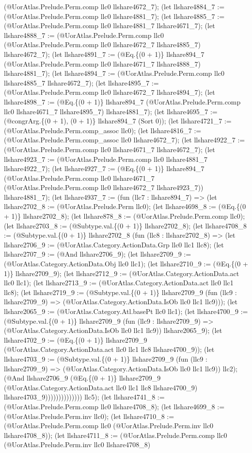 \documentclass[11pt]{article}
\begin{document}
(@UorAtlas.Prelude.Perm.comp llc0 llshare4672\_7); (let llshare4884\_7 := (@UorAtlas.Prelude.Perm.comp llc0 llshare4881\_7); (let llshare4885\_7 := (@UorAtlas.Prelude.Perm.comp llc0 llshare4881\_7 llshare4671\_7); (let llshare4888\_7 := (@UorAtlas.Prelude.Perm.comp llc0 (@UorAtlas.Prelude.Perm.comp llc0 llshare4672\_7 llshare4885\_7) llshare4672\_7); (let llshare4891\_7 := (@Eq.\{(0 + 1)\} llshare894\_7 (@UorAtlas.Prelude.Perm.comp llc0 llshare4671\_7 llshare4888\_7) llshare4881\_7); (let llshare4894\_7 := (@UorAtlas.Prelude.Perm.comp llc0 llshare4885\_7 llshare4672\_7); (let llshare4895\_7 := (@UorAtlas.Prelude.Perm.comp llc0 llshare4672\_7 llshare4894\_7); (let llshare4898\_7 := (@Eq.\{(0 + 1)\} llshare894\_7 (@UorAtlas.Prelude.Perm.comp llc0 llshare4671\_7 llshare4895\_7) llshare4881\_7); (let llshare4695\_7 := (@congrArg.\{(0 + 1), (0 + 1)\} llshare894\_7 (Sort 0)); (let llshare4721\_7 := (@UorAtlas.Prelude.Perm.comp\_assoc llc0); (let llshare4816\_7 := (@UorAtlas.Prelude.Perm.comp\_assoc llc0 llshare4672\_7); (let llshare4922\_7 := (@UorAtlas.Prelude.Perm.comp llc0 llshare4671\_7 llshare4672\_7); (let llshare4923\_7 := (@UorAtlas.Prelude.Perm.comp llc0 llshare4881\_7 llshare4922\_7); (let llshare4927\_7 := (@Eq.\{(0 + 1)\} llshare894\_7 (@UorAtlas.Prelude.Perm.comp llc0 llshare4671\_7 (@UorAtlas.Prelude.Perm.comp llc0 llshare4672\_7 llshare4923\_7)) llshare4881\_7); (let llshare4937\_7 := (fun (llc7 : llshare894\_7) => (let llshare2702\_8 := (@UorAtlas.Prelude.Perm llc0); (let llshare4698\_8 := (@Eq.\{(0 + 1)\} llshare2702\_8); (let llshare878\_8 := (@UorAtlas.Prelude.Perm.comp llc0); (let llshare2703\_8 := (@Subtype.val.\{(0 + 1)\} llshare2702\_8); (let llshare4708\_8 := (@Subtype.val.\{(0 + 1)\} llshare2702\_8 (fun (llc8 : llshare2702\_8) => (let llshare2706\_9 := (@UorAtlas.Category.ActionData.Grp llc0 llc1 llc8); (let llshare2707\_9 := (@And llshare2706\_9); (let llshare2709\_9 := (@UorAtlas.Category.ActionData.Obj llc0 llc1); (let llshare2710\_9 := (@Eq.\{(0 + 1)\} llshare2709\_9); (let llshare2712\_9 := (@UorAtlas.Category.ActionData.act llc0 llc1); (let llshare2713\_9 := (@UorAtlas.Category.ActionData.act llc0 llc1 llc8); (let llshare2719\_9 := (@Subtype.val.\{(0 + 1)\} llshare2709\_9 (fun (llc9 : llshare2709\_9) => (@UorAtlas.Category.ActionData.IsOb llc0 llc1 llc9))); (let llshare2065\_9 := (@UorAtlas.Category.Atl.basePt llc0 llc1); (let llshare4700\_9 := (@Subtype.val.\{(0 + 1)\} llshare2709\_9 (fun (llc9 : llshare2709\_9) => (@UorAtlas.Category.ActionData.IsOb llc0 llc1 llc9)) llshare2065\_9); (let llshare4702\_9 := (@Eq.\{(0 + 1)\} llshare2709\_9 (@UorAtlas.Category.ActionData.act llc0 llc1 llc8 llshare4700\_9)); (let llshare4703\_9 := (@Subtype.val.\{(0 + 1)\} llshare2709\_9 (fun (llc9 : llshare2709\_9) => (@UorAtlas.Category.ActionData.IsOb llc0 llc1 llc9)) llc2); (@And llshare2706\_9 (@Eq.\{(0 + 1)\} llshare2709\_9 (@UorAtlas.Category.ActionData.act llc0 llc1 llc8 llshare4700\_9) llshare4703\_9)))))))))))))) llc5); (let llshare4741\_8 := (@UorAtlas.Prelude.Perm.comp llc0 llshare4708\_8); (let llshare4699\_8 := (@UorAtlas.Prelude.Perm.inv llc0); (let llshare4710\_8 := (@UorAtlas.Prelude.Perm.comp llc0 (@UorAtlas.Prelude.Perm.inv llc0 llshare4708\_8)); (let llshare4711\_8 := (@UorAtlas.Prelude.Perm.comp llc0 (@UorAtlas.Prelude.Perm.inv llc0 llshare4708\_8) 
\end{document}
